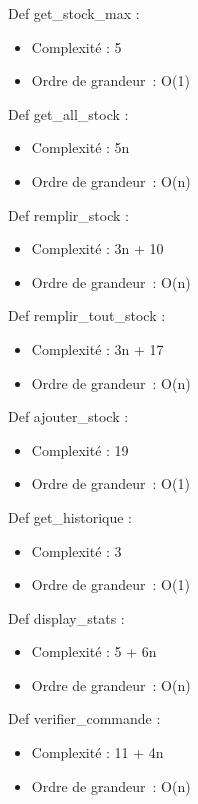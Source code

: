 \documentclass[]{article}
\begin{document}
Def get\_stock\_max :

\begin{itemize}
\item
  Complexité : 5
\item
  Ordre de grandeur~: O(1)
\end{itemize}

Def get\_all\_stock :

\begin{itemize}
\item
  Complexité : 5n
\item
  Ordre de grandeur~: O(n)
\end{itemize}

Def remplir\_stock :

\begin{itemize}
\item
  Complexité : 3n + 10
\item
  Ordre de grandeur~: O(n)
\end{itemize}

Def remplir\_tout\_stock :

\begin{itemize}
\item
  Complexité : 3n + 17
\item
  Ordre de grandeur~: O(n)
\end{itemize}

Def ajouter\_stock :

\begin{itemize}
\item
  Complexité : 19
\item
  Ordre de grandeur~: O(1)
\end{itemize}

Def get\_historique :

\begin{itemize}
\item
  Complexité : 3
\item
  Ordre de grandeur~: O(1)
\end{itemize}

Def display\_stats :

\begin{itemize}
\item
  Complexité : 5 + 6n
\item
  Ordre de grandeur~: O(n)
\end{itemize}

Def verifier\_commande :

\begin{itemize}
\item
  Complexité : 11 + 4n
\item
  Ordre de grandeur~: O(n)
\end{itemize}
\end{document}

